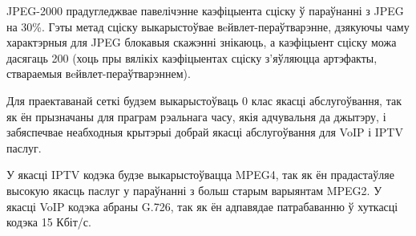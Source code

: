 JPEG-2000 прадугледжвае павелічэнне каэфіцыента сціску ў параўнанні з JPEG на 30\%. Гэты метад сціску выкарыстоўвае вeйвлет-пераўтварэнне, дзякуючы чаму характэрныя для JPEG блокавыя скажэнні знікаюць, а каэфіцыент сціску можа дасягаць 200 (хоць пры вялікіх каэфіцыентах сціску з'яўляюцца артэфакты, ствараемыя вeйвлет-пераўтварэннем).

Для праектаванай сеткі будзем выкарыстоўваць 0 клас якасці абслугоўвання, так як ён прызначаны для праграм рэальнага часу, якія адчувальня да джытэру, і забяспечвае неабходныя крытэрыі добрай якасці абслугоўвання для VoIP і IPTV паслуг.

У якасці IPTV кодэка будзе выкарыстоўвацца MPEG4, так як ён прадастаўляе
высокую якасць паслуг у параўнанні з больш старым варыянтам MPEG2.
У якасці VoIP кодэка абраны G.726, так як ён адпавядае патрабаванню ў
хуткасці кодэка 15 Кбіт/с.
